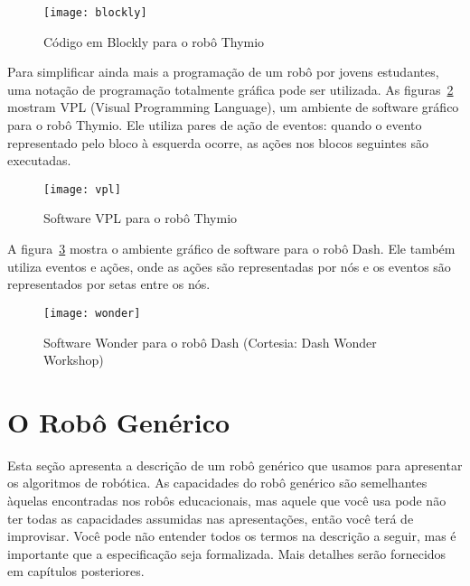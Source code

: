 \begin{figure}
\begin{center}
\texttt{[image: blockly]}
\end{center}
\caption{Código em Blockly para o robô Thymio}\label{fig.ide-blocks}
\end{figure}

Para simplificar ainda mais a programação de um robô por jovens estudantes, uma notação de programação totalmente gráfica pode ser utilizada. As figuras~\ref{fig.ide-thymio} mostram VPL (Visual Programming Language), um ambiente de software gráfico para o robô Thymio. Ele utiliza pares de ação de eventos: quando o evento representado pelo bloco à esquerda ocorre, as ações nos blocos seguintes são executadas.

\begin{figure}
\begin{center}
\texttt{[image: vpl]}
\end{center}
\caption{Software VPL para o robô Thymio}\label{fig.ide-thymio}
\end{figure}

A figura~\ref{fig.ide-dash} mostra o ambiente gráfico de software para o robô Dash. Ele também utiliza eventos e ações, onde as ações são representadas por nós e os eventos são representados por setas entre os nós.

\begin{figure}
\begin{center}
\texttt{[image: wonder]}
\end{center}
\caption{Software Wonder para o robô Dash (Cortesia: Dash Wonder Workshop)}\label{fig.ide-dash}
\end{figure}

\section{O Robô Genérico}\label{s.generic}

Esta seção apresenta a descrição de um robô genérico que usamos para apresentar os algoritmos de robótica. As capacidades do robô genérico são semelhantes àquelas encontradas nos robôs educacionais, mas aquele que você usa pode não ter todas as capacidades assumidas nas apresentações, então você terá de improvisar. Você pode não entender todos os termos na descrição a seguir, mas é importante que a especificação seja formalizada. Mais detalhes serão fornecidos em capítulos posteriores.

